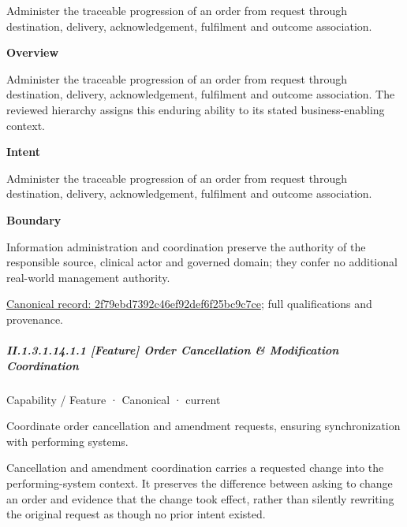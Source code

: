Administer the traceable progression of an order from request through destination, delivery, acknowledgement, fulfilment and outcome association.



\textbf{Overview}



Administer the traceable progression of an order from request through destination, delivery, acknowledgement, fulfilment and outcome association. The reviewed hierarchy assigns this enduring ability to its stated business-enabling context.



\textbf{Intent}



Administer the traceable progression of an order from request through destination, delivery, acknowledgement, fulfilment and outcome association.



\textbf{Boundary}



Information administration and coordination preserve the authority of the responsible source, clinical actor and governed domain; they confer no additional real-world management authority.


{\footnotesize \href{../../../../../../../continuum/strategy/capability/2f79ebd7392c46ef92def6f25bc9c7ce.md}{Canonical record: 2f79ebd7392c46ef92def6f25bc9c7ce}; full qualifications and provenance.}\par
\subparagraph*{II.1.3.1.14.1.1 [Feature] Order Cancellation \& Modification Coordination}
\label{navigation:II.1.3.1.14.1.1}

\label{element:6d12d9ddf4f8425ca60b289f3356f683}
{\small Capability / Feature · Canonical · current}\par

Coordinate order cancellation and amendment requests, ensuring synchronization with performing systems.



Cancellation and amendment coordination carries a requested change into the performing-system context. It preserves the difference between asking to change an order and evidence that the change took effect, rather than silently rewriting the original request as though no prior intent existed.


